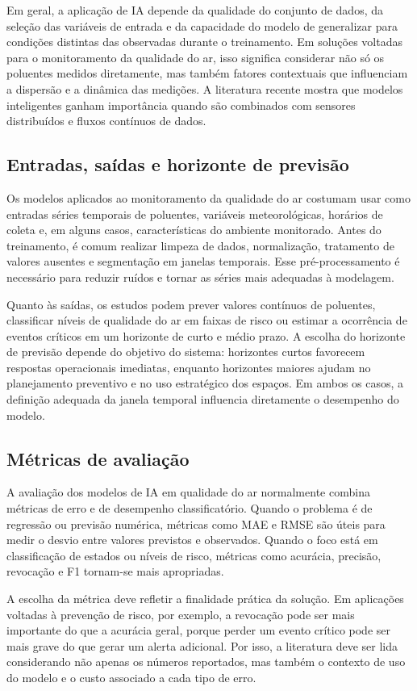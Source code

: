 \documentclass[12pt,a4paper]{article}
\begin{document}
Em geral, a aplicação de IA depende da qualidade do conjunto de dados, da seleção das variáveis de entrada e da capacidade do modelo de 
generalizar para condições distintas das observadas durante o treinamento. Em soluções voltadas para o monitoramento da qualidade do ar, 
isso significa considerar não só os poluentes medidos diretamente, mas também fatores contextuais que influenciam a dispersão e a dinâmica das 
medições. A literatura recente mostra que modelos inteligentes ganham importância quando são combinados com sensores distribuídos e fluxos 
contínuos de dados.

\subsection{Entradas, saídas e horizonte de previsão}
Os modelos aplicados ao monitoramento da qualidade do ar costumam usar como entradas séries temporais de poluentes, variáveis meteorológicas, 
horários de coleta e, em alguns casos, características do ambiente monitorado. Antes do treinamento, é comum realizar limpeza de dados, normalização, 
tratamento de valores ausentes e segmentação em janelas temporais. Esse pré-processamento é necessário para reduzir ruídos e tornar as séries mais 
adequadas à modelagem.

Quanto às saídas, os estudos podem prever valores contínuos de poluentes, classificar níveis de qualidade do ar em faixas de risco ou estimar a 
ocorrência de eventos críticos em um horizonte de curto e médio prazo. A escolha do horizonte de previsão depende do objetivo do sistema: 
horizontes curtos favorecem respostas operacionais imediatas, enquanto horizontes maiores ajudam no planejamento preventivo e no uso estratégico dos 
espaços. Em ambos os casos, a definição adequada da janela temporal influencia diretamente o desempenho do modelo.

\subsection{Métricas de avaliação}
A avaliação dos modelos de IA em qualidade do ar normalmente combina métricas de erro e de desempenho classificatório. Quando o problema é de 
regressão ou previsão numérica, métricas como MAE e RMSE são úteis para medir o desvio entre valores previstos e observados. Quando o foco está em 
classificação de estados ou níveis de risco, métricas como acurácia, precisão, revocação e F1 tornam-se mais apropriadas.

A escolha da métrica deve refletir a finalidade prática da solução. Em aplicações voltadas à prevenção de risco, por exemplo, a revocação 
pode ser mais importante do que a acurácia geral, porque perder um evento crítico pode ser mais grave do que gerar um alerta adicional. 
Por isso, a literatura deve ser lida considerando não apenas os números reportados, mas também o contexto de uso do modelo e o custo associado a 
cada tipo de erro.
\end{document}
